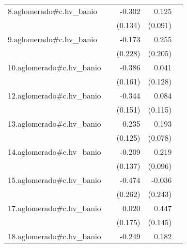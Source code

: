 {\begin{longtable}{l*{4}{D{.}{.}{-1}}}
\addlinespace
8.aglomerado#c.hv\_banio&                     &      -0.302\sym{*}  &       0.125         &                     \\
            &                     &     (0.134)         &     (0.091)         &                     \\
\addlinespace
9.aglomerado#c.hv\_banio&                     &      -0.173         &       0.255         &                     \\
            &                     &     (0.228)         &     (0.205)         &                     \\
\addlinespace
10.aglomerado#c.hv\_banio&                     &      -0.386\sym{*}  &       0.041         &                     \\
            &                     &     (0.161)         &     (0.128)         &                     \\
\addlinespace
12.aglomerado#c.hv\_banio&                     &      -0.344\sym{*}  &       0.084         &                     \\
            &                     &     (0.151)         &     (0.115)         &                     \\
\addlinespace
13.aglomerado#c.hv\_banio&                     &      -0.235         &       0.193\sym{*}  &                     \\
            &                     &     (0.125)         &     (0.078)         &                     \\
\addlinespace
14.aglomerado#c.hv\_banio&                     &      -0.209         &       0.219\sym{*}  &                     \\
            &                     &     (0.137)         &     (0.096)         &                     \\
\addlinespace
15.aglomerado#c.hv\_banio&                     &      -0.474         &      -0.036         &                     \\
            &                     &     (0.262)         &     (0.243)         &                     \\
\addlinespace
17.aglomerado#c.hv\_banio&                     &       0.020         &       0.447\sym{**} &                     \\
            &                     &     (0.175)         &     (0.145)         &                     \\
\addlinespace
18.aglomerado#c.hv\_banio&                     &      -0.249\sym{*}  &       0.182\sym{**} &                     \\

\end{longtable}}

